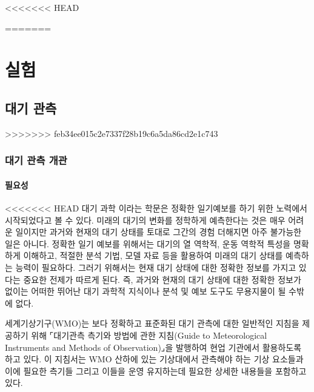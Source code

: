 
<<<<<<< HEAD

=======
\part{실험}

\chapter{대기 관측}
>>>>>>> feb34ee015c2e7337f28b19c6a5da86cd2e1c743


\section{대기 관측 개관}

\subsection{필요성}

<<<<<<< HEAD
대기 과학 이라는 학문은 정확한 일기예보를 하기 위한 노력에서 시작되었다고 볼 수 있다. 미래의 대기의 변화를 정학하게 예측한다는 것은 매우 어려운 일이지만 과거와 현재의 대기 상태를 토대로 그간의 경험 더해지면 아주 불가능한 일은 아니다. 정확한 일기 예보를 위해서는 대기의 열 역학적, 운동 역학적 특성을 명확하게 이해하고, 적절한 분석 기법, 모델 자료 등을 활용하여 미래의 대기 상태를 예측하는 능력이 필요하다. 그러기 위해서는 현재 대기 상태에 대한 정확한 정보를 가지고 있다는 중요한 전제가 따르게 된다. 즉, 과거와 현재의 대기 상태에 대한 정확한 정보가 없이는 어떠한 뛰어난 대기 과학적 지식이나 분석 및 예보 도구도 무용지물이 될 수밖에 없다.

세계기상기구(WMO)는 보다 정확하고 표준화된 대기 관측에 대한 일반적인 지침을 제공하기 위해 ⌜대기관측 측기와 방법에 관한 지침(Guide to Meteorological Instruments and Methods of Observation)⌟을 발행하여 현업 기관에서 활용하도록 하고 있다. 이 지침서는 WMO 산하에 있는 기상대에서 관측해야 하는 기상 요소들과 이에 필요한 측기들 그리고 이들을 운영 유지하는데 필요한 상세한 내용들을 포함하고 있다. 

